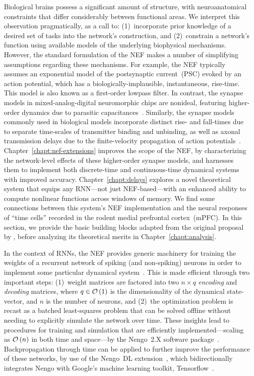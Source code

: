 Biological brains possess a significant amount of structure, with neuroanatomical constraints that differ considerably between functional areas. %
We interpret this observation pragmatically, as a call to: (1)~incorporate prior knowledge of a desired set of tasks into the network's construction, and (2)~constrain a network's function using available models of the underlying biophysical mechanisms.
However, the standard formulation of the NEF makes a number of simplifying assumptions regarding these mechanisms.
For example, the NEF typically assumes an exponential model of the postsynaptic current~(PSC) evoked by an action potential, which has a biologically-implausible, instantaneous, rise-time.
This model is also known as a first-order lowpass filter.
In contrast, the synapse models in mixed-analog-digital neuromorphic chips are nonideal, featuring higher-order dynamics due to parasitic capacitances~\citep{voelker2017iscas}.
Similarly, the synapse models commonly used in biological models incorporate distinct rise- and fall-times due to separate time-scales of transmitter binding and unbinding, as well as axonal transmission delays due to the finite-velocity propagation of action potentials~\citep{roth2009modeling}.
Chapter~\ref{chapt:nef-extensions} improves the scope of the NEF, by characterizing the network-level effects of these higher-order synapse models, and harnesses them to implement both discrete-time and continuous-time dynamical systems with improved accuracy.
Chapter~\ref{chapt:delays} explores a novel theoretical system that equips any RNN---not just NEF-based---with an enhanced ability to compute nonlinear functions across windows of memory.
We find some connections between this system's NEF implementation and the neural responses of ``time cells'' recorded in the rodent medial prefrontal cortex~(mPFC).
In this section, we provide the basic building blocks adapted from the original proposal by \citet{eliasmith2003a}, before analyzing its theoretical merits in Chapter~\ref{chapt:analysis}.

In the context of RNNs, the NEF provides generic machinery for training the weights of a recurrent network of spiking (and non-spiking) neurons in order to implement some particular dynamical system~\citep{dynamicspatent}.
This is made efficient through two important steps: (1)~weight matrices are factored into two $n \times q$ \emph{encoding} and \emph{decoding} matrices, where $q \in \mathcal{O}\left({1}\right)$ is the dimensionality of the dynamical state-vector, and $n$ is the number of neurons, and (2)~the optimization problem is recast as a batched least-squares problem that can be solved offline without needing to explicitly simulate the network over time.
These insights lead to procedures for training and simulation that are efficiently implemented---scaling as $\mathcal{O}\left({n}\right)$ in both time and space---by the Nengo~2.X software package~\citep{bekolay2013}.
Backpropagation through time can be applied to further improve the performance of these networks, by use of the Nengo~DL extension~\citep{hunsberger2018, rasmussen2018nengodl, blouw2018a}, which bidirectionally integrates Nengo with Google's machine learning toolkit, Tensorflow~\citep{abadi2016tensorflow}.

